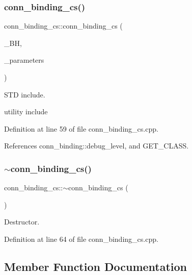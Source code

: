 \subsubsection{\texorpdfstring{conn\+\_\+binding\+\_\+cs()}{conn\_binding\_cs()}}
{\footnotesize\ttfamily conn\+\_\+binding\+\_\+cs\+::conn\+\_\+binding\+\_\+cs (\begin{DoxyParamCaption}\item[{const \hyperlink{behavioral__helper_8hpp_aae973b54cac87eef3b27442aa3e1e425}{Behavioral\+Helper\+Const\+Ref}}]{\+\_\+\+BH,  }\item[{const \hyperlink{Parameter_8hpp_a37841774a6fcb479b597fdf8955eb4ea}{Parameter\+Const\+Ref}}]{\+\_\+parameters }\end{DoxyParamCaption})}





S\+TD include.

utility include 

Definition at line 59 of file conn\+\_\+binding\+\_\+cs.\+cpp.



References conn\+\_\+binding\+::debug\+\_\+level, and G\+E\+T\+\_\+\+C\+L\+A\+SS.

\mbox{\label{classconn__binding__cs_af78b42a44ece4f56759e9c1870bc2aeb}} 
\subsubsection{\texorpdfstring{$\sim$conn\+\_\+binding\+\_\+cs()}{~conn\_binding\_cs()}}
{\footnotesize\ttfamily conn\+\_\+binding\+\_\+cs\+::$\sim$conn\+\_\+binding\+\_\+cs (\begin{DoxyParamCaption}{ }\end{DoxyParamCaption})\hspace{0.3cm}{\ttfamily [virtual]}}



Destructor. 



Definition at line 64 of file conn\+\_\+binding\+\_\+cs.\+cpp.



\subsection{Member Function Documentation}
\mbox{\label{classconn__binding__cs_a1ab5041953556d30503a795859c3121c}} 
